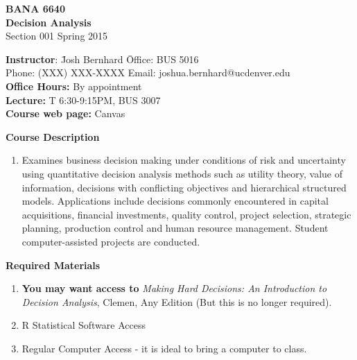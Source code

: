 \documentclass[11pt]{article}
\begin{document}
\begin{center}
\LARGE \textbf{BANA 6640} \\
\Large \textbf{Decision Analysis} \\
\normalsize Section 001 Spring 2015\\
\end{center}
\normalsize
\begin{tabbing}
\textbf{Instructor}: \qquad \qquad \qquad \= Josh Bernhard  \qquad \qquad \qquad \qquad \qquad \= Office: BUS 5016\\
\> Phone: (XXX) XXX-XXXX \>  Email: joshua.bernhard@ucdenver.edu\\[.1cm]
\textbf{Office Hours:} \> By appointment\\[.1cm]
\textbf{Lecture:}  \> T 6:30-9:15PM, BUS 3007 \> \\[.1cm]
\textbf{Course web page:} \>   Canvas \\[.1cm]
\end{tabbing}


\vspace*{.3cm}
\noindent\textbf{{\large Course Description}}
\begin{enumerate}
\item[] Examines business decision making under conditions of risk and uncertainty
using quantitative decision analysis methods such as utility theory, value of
information, decisions with conflicting objectives and hierarchical structured
models. Applications include decisions commonly encountered in capital acquisitions,
financial investments, quality control, project selection, strategic planning, production control and human resource management. Student computer-assisted projects
are conducted. \\[-.6cm]
\end{enumerate}


\vspace*{.3cm}
\noindent\textbf{{\large Required Materials}}
\begin{enumerate}
    \item  \textbf{You may want access to} \emph{Making Hard Decisions: An Introduction to Decision Analysis}, 
    Clemen, Any Edition (But this is no longer required).\vspace{-2.5mm}
  	\item  R Statistical Software Access \vspace{-2.5mm}
    \item  Regular Computer Access - it is ideal to bring a computer to class.
\end{enumerate}
\end{document}
